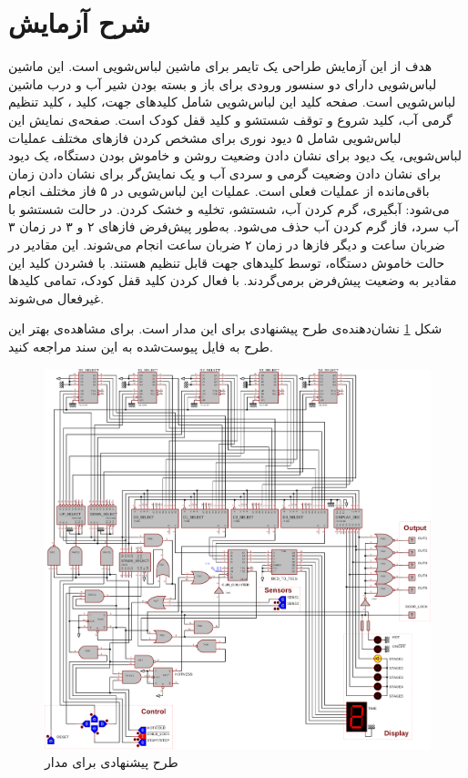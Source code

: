 \section{شرح آزمایش}

هدف از این آزمایش طراحی یک تایمر برای ماشین لباس‌شویی است. این ماشین لباس‌شویی دارای دو سنسور ورودی برای باز و بسته بودن شیر آب و درب ماشین لباس‌شویی است. صفحه کلید این لباس‌شویی شامل کلیدهای جهت، کلید
، کلید تنظیم گرمی آب، کلید شروع و توقف شستشو و کلید قفل کودک است. صفحه‌ی نمایش این لباس‌شویی شامل ۵ دیود نوری برای مشخص کردن فازهای مختلف عملیات لباس‌شویی، یک دیود برای نشان دادن وضعیت روشن و خاموش بودن دستگاه، یک دیود برای نشان دادن وضعیت گرمی و سردی آب و یک نمایش‌گر برای نشان  دادن زمان باقی‌مانده از عملیات فعلی است. عملیات این لباس‌شویی در ۵ فاز مختلف انجام می‌شود: آبگیری، گرم کردن آب، شستشو، تخلیه و خشک کردن. در حالت شستشو با آب سرد، فاز گرم کردن آب حذف می‌شود. به‌طور پیش‌فرض فازهای ۲ و ۳ در زمان ۳ ضربان ساعت و دیگر فازها در زمان ۲ ضربان ساعت انجام می‌شوند. این مقادیر در حالت خاموش دستگاه، توسط کلیدهای جهت قابل تنظیم هستند. با فشردن کلید
این مقادیر به وضعیت پیش‌فرض برمی‌گردند. با فعال کردن کلید قفل کودک، تمامی کلیدها غیرفعال می‌شوند.

شکل
\ref{fig:schema}
نشان‌دهنده‌ی طرح پیشنهادی برای این مدار است. برای مشاهده‌ی بهتر این طرح به فایل پیوست‌شده به این سند مراجعه کنید.

\begin{figure}[ht]
	\centering
	\includegraphics[width=\textwidth]{figs/schema.png}
	\caption{طرح پیشنهادی برای مدار}
	\label{fig:schema}
\end{figure}

